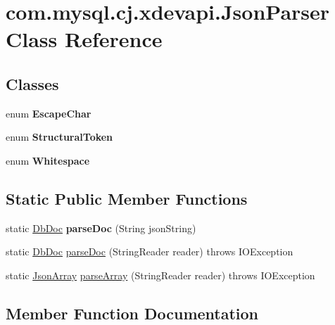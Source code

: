 \hypertarget{classcom_1_1mysql_1_1cj_1_1xdevapi_1_1_json_parser}{}\section{com.\+mysql.\+cj.\+xdevapi.\+Json\+Parser Class Reference}
\label{classcom_1_1mysql_1_1cj_1_1xdevapi_1_1_json_parser}
\subsection*{Classes}
\begin{DoxyCompactItemize}
\item 
enum {\bfseries Escape\+Char}
\item 
enum {\bfseries Structural\+Token}
\item 
enum {\bfseries Whitespace}
\end{DoxyCompactItemize}
\subsection*{Static Public Member Functions}
\begin{DoxyCompactItemize}
\item 
\mbox{\label{classcom_1_1mysql_1_1cj_1_1xdevapi_1_1_json_parser_ad779f7c1563d2bcca7481d3655519501}} 
static \mbox{\hyperlink{interfacecom_1_1mysql_1_1cj_1_1xdevapi_1_1_db_doc}{Db\+Doc}} {\bfseries parse\+Doc} (String json\+String)
\item 
static \mbox{\hyperlink{interfacecom_1_1mysql_1_1cj_1_1xdevapi_1_1_db_doc}{Db\+Doc}} \mbox{\hyperlink{classcom_1_1mysql_1_1cj_1_1xdevapi_1_1_json_parser_a09f9af593473756e34e7e87fb3022cc4}{parse\+Doc}} (String\+Reader reader)  throws I\+O\+Exception 
\item 
static \mbox{\hyperlink{classcom_1_1mysql_1_1cj_1_1xdevapi_1_1_json_array}{Json\+Array}} \mbox{\hyperlink{classcom_1_1mysql_1_1cj_1_1xdevapi_1_1_json_parser_a93178bb203463520aef663bd3d411ea2}{parse\+Array}} (String\+Reader reader)  throws I\+O\+Exception 
\end{DoxyCompactItemize}


\subsection{Member Function Documentation}
\mbox{\label{classcom_1_1mysql_1_1cj_1_1xdevapi_1_1_json_parser_a93178bb203463520aef663bd3d411ea2}} 

